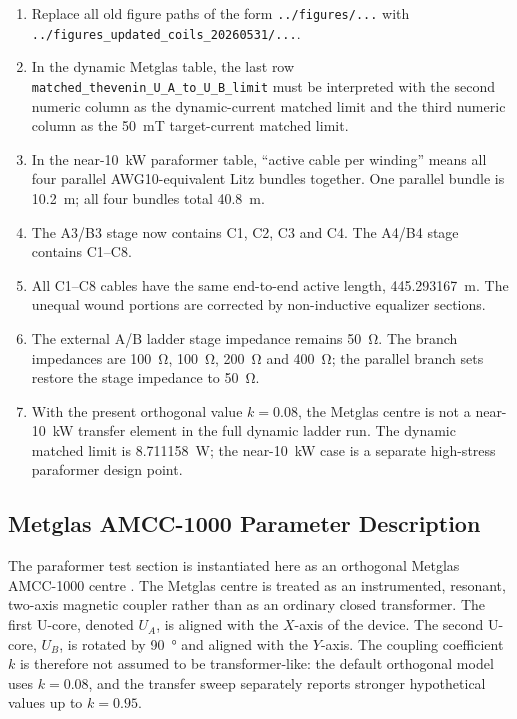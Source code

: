 \begin{enumerate}
\item Replace all old figure paths of the form \texttt{../figures/...} with
\texttt{../figures\_updated\_coils\_20260531/...}.
\item In the dynamic Metglas table, the last row
\texttt{matched\_thevenin\_U\_A\_to\_U\_B\_limit} must be interpreted with the
second numeric column as the dynamic-current matched limit and the third numeric
column as the \SI{50}{\milli\tesla} target-current matched limit.
\item In the near-\SI{10}{\kilo\watt} paraformer table, ``active cable per
winding'' means all four parallel AWG10-equivalent Litz bundles together. One
parallel bundle is \SI{10.2}{\metre}; all four bundles total
\SI{40.8}{\metre}.
\item The A3/B3 stage now contains C1, C2, C3 and C4. The A4/B4 stage contains
C1--C8.
\item All C1--C8 cables have the same end-to-end active length,
\SI{445.293167}{\metre}. The unequal wound portions are corrected by
non-inductive equalizer sections.
\item The external A/B ladder stage impedance remains \SI{50}{\ohm}. The branch
impedances are \SI{100}{\ohm}, \SI{100}{\ohm}, \SI{200}{\ohm} and
\SI{400}{\ohm}; the parallel branch sets restore the stage impedance to
\SI{50}{\ohm}.
\item With the present orthogonal value \(k=0.08\), the Metglas centre is not a
near-\SI{10}{\kilo\watt} transfer element in the full dynamic ladder run. The
dynamic matched limit is \SI{8.711158}{\watt}; the near-\SI{10}{\kilo\watt}
case is a separate high-stress paraformer design point.
\end{enumerate}

\subsection{Metglas AMCC-1000 Parameter Description}
\label{subsec:metglas-amcc1000-parameters}

The paraformer test section is instantiated here as an orthogonal Metglas
AMCC-1000 centre \cite{amcc1000}. The Metglas centre is treated as an
instrumented, resonant, two-axis magnetic coupler rather than as an ordinary
closed transformer. The first U-core, denoted \(U_A\), is aligned with the
\(X\)-axis of the device. The second U-core, \(U_B\), is rotated by
\SI{90}{\degree} and aligned with the \(Y\)-axis. The coupling coefficient
\(k\) is therefore not assumed to be transformer-like: the default orthogonal
model uses \(k=0.08\), and the transfer sweep separately reports stronger
hypothetical values up to \(k=0.95\).

